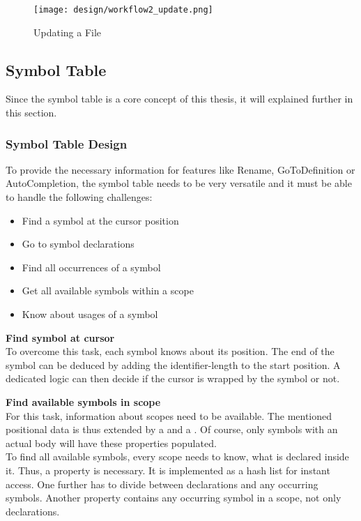 \begin{figure}[H]
    \centering
    \texttt{[image: design/workflow2\_update.png]}
    \caption{Updating a File}
    \label{fig:workflow2}
\end{figure}


\subsection{Symbol Table}
Since the symbol table is a core concept of this thesis, it will explained further in this section.

\subsubsection{Symbol Table Design}
To provide the necessary information for features like Rename, GoToDefinition or AutoCompletion,
the symbol table needs to be very versatile and it must be able to handle the following challenges:
\begin{itemize}
    \item Find a symbol at the cursor position
    \item Go to symbol declarations
    \item Find all occurrences of a symbol
    \item Get all available symbols within a scope
    \item Know about usages of a symbol
\end{itemize}

\textbf{Find symbol at cursor}\\
To overcome this task, each symbol knows about its position.
The end of the symbol can be deduced by adding the identifier-length to the start position.
A dedicated logic can then decide if the cursor is wrapped by the symbol or not.

\textbf{Find available symbols in scope}\\
For this task, information about scopes need to be available.
The mentioned positional data is thus extended by a  and a .
Of course, only symbols with an actual body will have these properties populated.\\

To find all available symbols, every scope needs to know, what is declared inside it.
Thus, a property  is necessary.
It is implemented as a hash list for instant access.
One further has to divide between declarations and any occurring symbols.
Another property  contains any occurring symbol in a scope, not only declarations.

